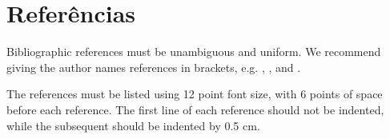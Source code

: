 \documentclass[12pt]{article}
\begin{document}




\section{Referências}

Bibliographic references must be unambiguous and uniform.  We recommend giving
the author names references in brackets, e.g. \cite{knuth:84},
\cite{boulic:91}, and \cite{smith:99}.

The references must be listed using 12 point font size, with 6 points of space
before each reference. The first line of each reference should not be
indented, while the subsequent should be indented by 0.5 cm.



\end{document}
